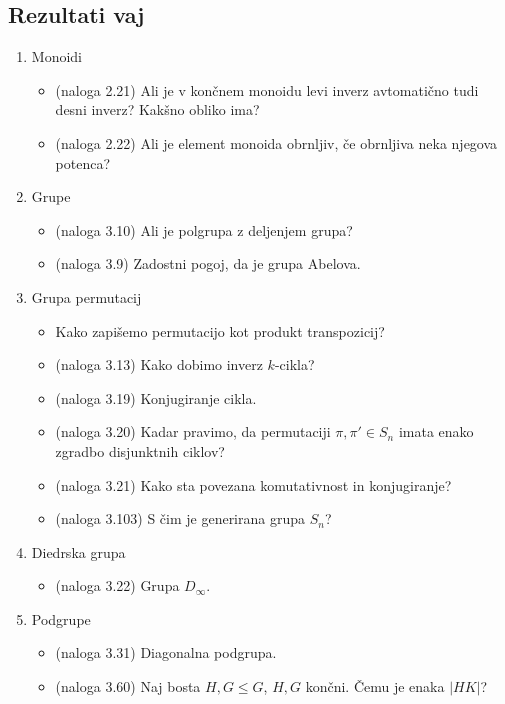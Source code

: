 \subsection*{Rezultati vaj}
\begin{enumerate}
    \item Monoidi     
    \begin{itemize}
        \item (naloga 2.21) Ali je v končnem monoidu levi inverz avtomatično tudi desni inverz? Kakšno obliko ima? 
        \item (naloga 2.22) Ali je element monoida obrnljiv, če obrnljiva neka njegova potenca? 
    \end{itemize}

    \item Grupe
    \begin{itemize}
        \item (naloga 3.10) Ali je polgrupa z deljenjem grupa?
        \item (naloga 3.9) Zadostni pogoj, da je grupa Abelova.
    \end{itemize}
    \item Grupa permutacij
    \begin{itemize}
        \item Kako zapišemo permutacijo kot produkt transpozicij?
        \item (naloga 3.13) Kako dobimo inverz $k$-cikla?
        \item (naloga 3.19) Konjugiranje cikla.
        \item (naloga 3.20) Kadar pravimo, da permutaciji $\pi, \pi' \in S_n$ imata enako zgradbo disjunktnih ciklov?
        \item (naloga 3.21) Kako sta povezana komutativnost in konjugiranje?
        \item (naloga 3.103) S čim je generirana grupa $S_n$?
    \end{itemize}

    \item Diedrska grupa
    \begin{itemize}
        \item (naloga 3.22) Grupa $D_\infty$.
    \end{itemize}

    \item Podgrupe
    \begin{itemize}
        \item (naloga 3.31) Diagonalna podgrupa.
        \item (naloga 3.60) Naj bosta $H, G \leq G$, $H, G$ končni. Čemu je enaka $|HK|$?
    \end{itemize}


\end{enumerate}
